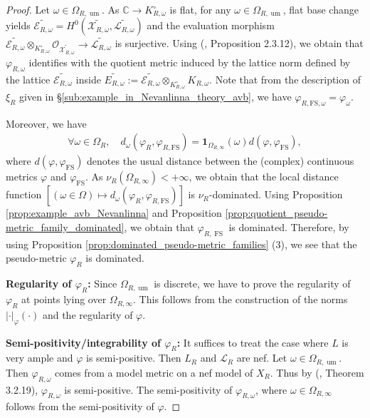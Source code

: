 \documentclass [11pt,reqno]{amsart}
\def\bC{{\mathbb{C}}}
\newcommand{\1}{\mathmybb{1}}
\def\cE{{\mathcal{E}}}
\def\cL{{\mathcal{L}}}
\def\cO{{\mathcal{O}}}
\def\cX{{\mathcal{X}}}
\def\FS{\operatorname{FS}}
\def\um{\operatorname{um}}
\def\tilde{\widetilde}
\begin{document}
\begin{proof}
Let $\omega\in \Omega_{R,\um}$. As $\bC \to K_{R,\omega}^{\circ}$ is flat, for any $\omega\in \Omega_{R,\um}$, flat base change yields $\tilde{\cE_{R,\omega}}= H^{0}(\tilde{\cX_{R,\omega}},\tilde{\cL_{R,\omega}})$ and the evaluation morphism $\tilde{\cE_{R,\omega}} \otimes_{K_{R,\omega}^{\circ}} \cO_{\tilde{\cX_{R,\omega}}} \to \tilde{\cL_{R,\omega}}$ is surjective. Using (\cite{ChenMori}, Proposition 2.3.12), we obtain that $\varphi_{R,\omega}$ identifies with the quotient metric induced by the lattice norm defined by the lattice $\tilde{\cE_{R,\omega}}$ inside $\tilde{E_{R,\omega}}:=\tilde{\cE_{R,\omega}} \otimes_{K_{R,\omega}^{\circ}} K_{R,\omega}$. Note that from the description of $\xi_R$ given in \S \ref{sub:example_in_Nevanlinna_theory_avb}, we have $\varphi_{R,\mathrm{FS},\omega}=\varphi_{\omega}$. 

Moreover, we have 
\begin{align*}
\forall \omega\in \Omega_{R}, \quad d_{\omega}(\varphi_R,\varphi_{R,\mathrm{FS}}) = \mathbf{1}_{\Omega_{R,\infty}}(\omega)d(\varphi,\varphi_{\mathrm{FS}}),
\end{align*}
where $d(\varphi,\varphi_{\mathrm{FS}})$ denotes the usual distance between the (complex) continuous metrics $\varphi$ and $\varphi_{\mathrm{FS}}$. As $\nu_R(\Omega_{R,\infty})<+\infty$, we obtain that the local distance function $[(\omega\in\Omega) \mapsto d_{\omega}(\varphi_R,\varphi_{R,\mathrm{FS}})]$ is $\nu_R$-dominated. Using Proposition \ref{prop:example_avb_Nevanlinna} and Proposition \ref{prop:quotient_pseudo-metric_family_dominated}, we obtain that $\varphi_{R,\FS}$ is dominated. Therefore, by using Proposition \ref{prop:dominated_pseudo-metric_families} (3), we see that the pseudo-metric $\varphi_R$ is dominated.

\textbf{Regularity of $\varphi_{R}$:} Since $\Omega_{R,\um}$ is discrete, we have to prove the regularity of $\varphi_{R}$ at points lying over $\Omega_{R,\infty}$. This follows from the construction of the norms $|\cdot|_{\varphi}(\cdot)$ and the regularity of $\varphi$. 

\textbf{Semi-positivity/integrability of $\varphi_{R}$:} It suffices to treat the case where $L$ is very ample and $\varphi$ is semi-positive. Then $L_{R}$ and $\cL_{R}$ are nef. Let $\omega\in\Omega_{R,\um}$. Then $\varphi_{R,\omega}$ comes from a model metric on a nef model of $X_{R}$. Thus by (\cite{ChenMori21}, Theorem 3.2.19), $\varphi_{R,\omega}$ is semi-positive. The semi-positivity of $\varphi_{R,\omega}$, where $\omega\in\Omega_{R,\infty}$ follows from the semi-positivity of $\varphi$.
\end{proof}
\end{document}
